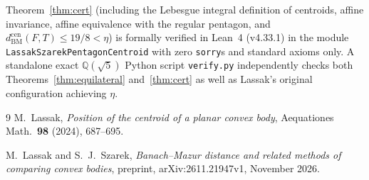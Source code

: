 \documentclass[11pt]{article}
\begin{document}
Theorem~\ref{thm:cert} (including the Lebesgue integral definition of centroids,
affine invariance, affine equivalence with the regular pentagon, and
$d_{\mathrm{BM}}^{\mathrm{cen}}(F, T) \le 19/8 < \eta$) is formally verified in
Lean~4 (v4.33.1) in the module \texttt{LassakSzarekPentagonCentroid} with zero
\texttt{sorry}s and standard axioms only. A standalone exact
$\mathbb{Q}(\sqrt{5})$ Python script \texttt{verify.py} independently checks
both Theorems~\ref{thm:equilateral} and~\ref{thm:cert} as well as Lassak's
original configuration achieving $\eta$.

\begin{thebibliography}{9}
M.~Lassak,
\emph{Position of the centroid of a planar convex body},
Aequationes Math.\ \textbf{98} (2024), 687--695.

M.~Lassak and S.~J.~Szarek,
\emph{Banach--Mazur distance and related methods of comparing convex bodies},
preprint, arXiv:2611.21947v1, November 2026.
\end{thebibliography}
\end{document}
